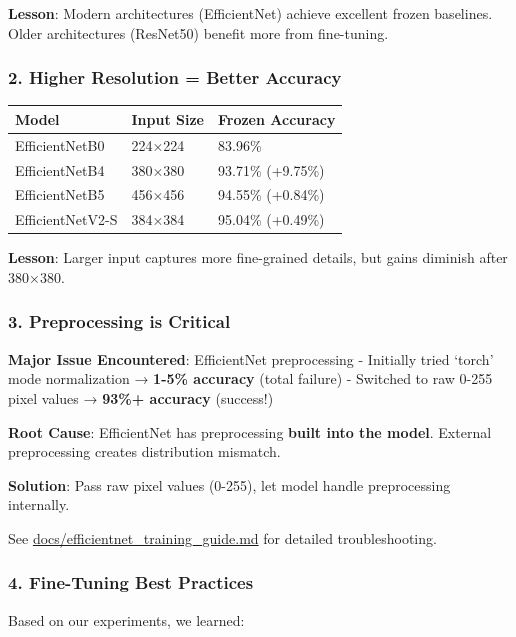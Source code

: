 \documentclass[
  letterpaper,
  DIV=11,
  numbers=noendperiod]{scrartcl}
\begin{document}
\textbf{Lesson}: Modern architectures (EfficientNet) achieve excellent
frozen baselines. Older architectures (ResNet50) benefit more from
fine-tuning.

\subsubsection{2. Higher Resolution = Better
Accuracy}\label{higher-resolution-better-accuracy}

\begin{longtable}[]{@{}lll@{}}
\toprule\noalign{}
Model & Input Size & Frozen Accuracy \\
\midrule\noalign{}
\endhead
\bottomrule\noalign{}
\endlastfoot
EfficientNetB0 & 224×224 & 83.96\% \\
EfficientNetB4 & 380×380 & 93.71\% (+9.75\%) \\
EfficientNetB5 & 456×456 & 94.55\% (+0.84\%) \\
EfficientNetV2-S & 384×384 & 95.04\% (+0.49\%) \\
\end{longtable}

\textbf{Lesson}: Larger input captures more fine-grained details, but
gains diminish after 380×380.

\subsubsection{3. Preprocessing is
Critical}\label{preprocessing-is-critical}

\textbf{Major Issue Encountered}: EfficientNet preprocessing - Initially
tried `torch' mode normalization → \textbf{1-5\% accuracy} (total
failure) - Switched to raw 0-255 pixel values → \textbf{93\%+ accuracy}
(success!)

\textbf{Root Cause}: EfficientNet has preprocessing \textbf{built into
the model}. External preprocessing creates distribution mismatch.

\textbf{Solution}: Pass raw pixel values (0-255), let model handle
preprocessing internally.

See
\href{../docs/efficientnet_training_guide.md}{docs/efficientnet\_training\_guide.md}
for detailed troubleshooting.

\subsubsection{4. Fine-Tuning Best
Practices}\label{fine-tuning-best-practices}

Based on our experiments, we learned:
\end{document}
